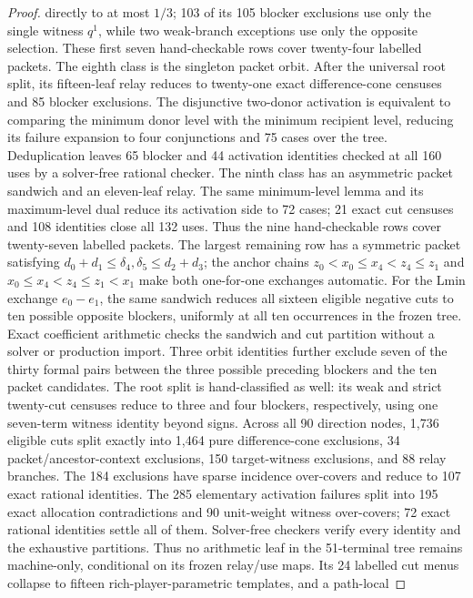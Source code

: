 \documentclass[11pt]{article}
\begin{document}
\begin{proof}
directly to at most $1/3$; 103 of its 105 blocker exclusions use only the
single witness $q^1$, while two weak-branch exceptions use only the opposite
selection.  These first seven hand-checkable rows cover twenty-four labelled packets.
The eighth class is the singleton packet orbit.  After the universal root
split, its fifteen-leaf relay reduces to twenty-one exact difference-cone
censuses and 85 blocker exclusions.  The disjunctive two-donor activation is
equivalent to comparing the minimum donor level with the minimum recipient
level, reducing its failure expansion to four conjunctions and 75 cases over
the tree.  Deduplication leaves 65 blocker and 44 activation identities checked
at all 160 uses by a solver-free rational
checker.  The ninth class has an asymmetric packet sandwich and an eleven-leaf
relay.  The same minimum-level lemma and its maximum-level dual reduce its
activation side to 72 cases; 21 exact cut censuses and 108 identities close all
132 uses.  Thus the nine hand-checkable rows cover twenty-seven labelled
packets.  The largest remaining row has a symmetric packet satisfying
$d_0+d_1\leq\delta_4,\delta_5\leq d_2+d_3$; the anchor chains
$z_0<x_0\leq x_4<z_4\leq z_1$ and
$x_0\leq x_4<z_4\leq z_1<x_1$ make both one-for-one exchanges automatic.
For the Lmin exchange $e_0-e_1$, the same sandwich reduces all sixteen
eligible negative cuts to ten possible opposite blockers, uniformly at all
ten occurrences in the frozen tree.  Exact coefficient arithmetic checks the
sandwich and cut partition without a solver or production import.  Three
orbit identities further exclude seven of the thirty formal pairs between
the three possible preceding blockers and the ten packet candidates.  The
root split is hand-classified as well: its weak
and strict twenty-cut censuses reduce to three and four blockers, respectively,
using one seven-term witness identity beyond signs.  Across all 90 direction
nodes, 1,736 eligible cuts split exactly into 1,464 pure difference-cone
exclusions, 34 packet/ancestor-context exclusions, 150 target-witness
exclusions, and 88 relay branches.  The 184 exclusions have sparse incidence
over-covers and reduce to 107 exact rational identities.  The 285 elementary
activation failures split into 195 exact allocation contradictions and 90
unit-weight witness over-covers; 72 exact rational identities settle all of
them.  Solver-free checkers verify every identity and the exhaustive
partitions.  Thus no arithmetic leaf in the 51-terminal tree remains
machine-only, conditional on its frozen relay/use maps.  Its 24 labelled cut
menus collapse to fifteen rich-player-parametric templates, and a path-local

\end{proof}
\end{document}
